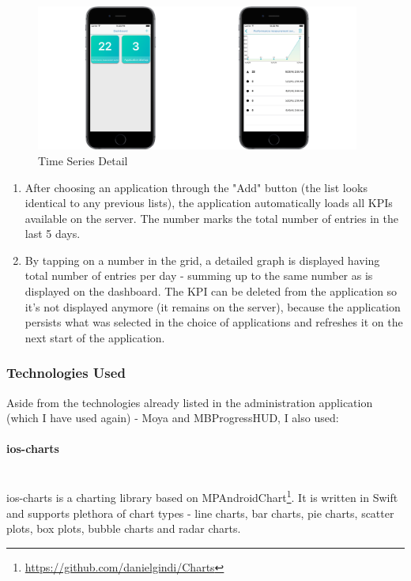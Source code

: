 \begin{figure}[!ht]
	\centering
	\includegraphics[width=0.95\textwidth]{figures/04_implementation/time_flow}
    \caption{Time Series Detail}
\end{figure}

\begin{enumerate}
	\item After choosing an application through the "Add" button (the list looks identical to any previous lists), the application automatically loads all KPIs available on the server. The number marks the total number of entries in the last 5 days.
	\item By tapping on a number in the grid, a detailed graph is displayed having total number of entries per day - summing up to the same number as is displayed on the dashboard. The KPI can be deleted from the application so it's not displayed anymore (it remains on the server), because the application persists what was selected in the choice of applications and refreshes it on the next start of the application.
\end{enumerate}

\subsubsection{Technologies Used}

Aside from the technologies already listed in the administration application (which I have used again) - Moya and MBProgressHUD, I also used:

\paragraph{ios-charts}\mbox{}\\

ios-charts is a charting library based on MPAndroidChart\footnote{\url{https://github.com/danielgindi/Charts}}. It is written in Swift and supports plethora of chart types - line charts, bar charts, pie charts, scatter plots, box plots, bubble charts and radar charts.

